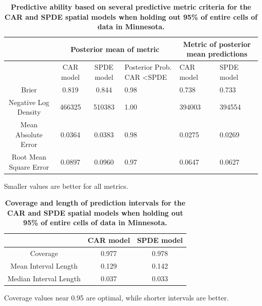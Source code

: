 \documentclass[10pt,letterpaper]{article}
\begin{document}
\begin{table}
\begin{adjustwidth}{-2.25in}{0in}
\caption{{\bf Predictive ability based on several predictive metric criteria for
the CAR and SPDE spatial models when holding out 95\% of entire cells
of data in Minnesota.}}


\begin{tabular}{|c|c|c|>{\centering}p{3cm}|>{\centering}p{2.5cm}|>{\centering}p{2.5cm}|}
\hline 
 &
\multicolumn{3}{c|}{{\small{}Posterior mean of metric}} &
\multicolumn{2}{c|}{{\small{}Metric of posterior mean predictions}}\tabularnewline
\hline 
\hline 
 &
{\small{}CAR model} &
{\small{}SPDE model} &
{\small{}Posterior Prob. CAR \textless  SPDE} &
{\small{}CAR model} &
{\small{}SPDE model}\tabularnewline
\hline 
{\small{}Brier} &
{\small{}0.819} &
{\small{}0.844} &
{\small{}0.98} &
{\small{}0.738} &
{\small{}0.733}\tabularnewline
\hline 
{\small{}Negative Log Density} &
{\small{}466325} &
{\small{}510383} &
{\small{}1.00} &
{\small{}394003} &
{\small{}394554}\tabularnewline
\hline 
{\small{}Mean Absolute Error} &
{\small{}0.0364} &
{\small{}0.0383} &
{\small{}0.98} &
{\small{}0.0275} &
{\small{}0.0269}\tabularnewline
\hline 
{\small{}Root Mean Square Error} &
{\small{}0.0897} &
{\small{}0.0960} &
{\small{}0.97} &
{\small{}0.0647} &
{\small{}0.0627}\tabularnewline
\hline 
\end{tabular}
\begin{flushleft}
Smaller values are better for all metrics.
\end{flushleft}
\label{tab:score_cell_fivepercent}
\end{adjustwidth}
\end{table}


\begin{table}
\begin{adjustwidth}{-2.25in}{0in}
\caption{{\bf Coverage and length of prediction intervals for the CAR and SPDE spatial
models when holding out 95\% of entire cells of data in Minnesota.
}}


\begin{tabular}{|c|c|c|}
\hline 
 &
{\small{}CAR model} &
{\small{}SPDE model}\tabularnewline
\hline 
{\small{}Coverage} &
{\small{}0.977} &
{\small{}0.978}\tabularnewline
\hline 
{\small{}Mean Interval Length} &
{\small{}0.129} &
{\small{}0.142}\tabularnewline
\hline 
{\small{}Median Interval Length} &
{\small{}0.037} &
{\small{}0.033}\tabularnewline
\hline 
\end{tabular}
\begin{flushleft}
Coverage values near 0.95 are optimal, while shorter intervals are
better.
\end{flushleft}
\label{tab:coverage_cell_fivepercent}
\end{adjustwidth}
\end{table}
\end{document}
